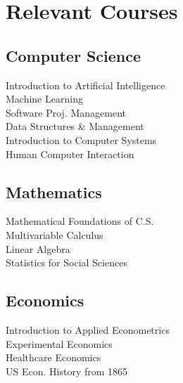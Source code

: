 
\section{Relevant Courses}
\subsection{Computer Science}
Introduction to Artificial Intelligence\\
Machine Learning\\
Software Proj. Management\\
Data Structures \& Management\\
Introduction to Computer Systems\\
Human Computer Interaction\\
\sectionsep

\subsection{Mathematics}
Mathematical Foundations of C.S.\\
Multivariable Calculus\\
Linear Algebra\\
Statistics for Social Sciences\\
\sectionsep

\subsection{Economics}
Introduction to Applied Econometrics\\
Experimental Economics\\
Healthcare Economics\\
US Econ. History from 1865\\
\sectionsep
